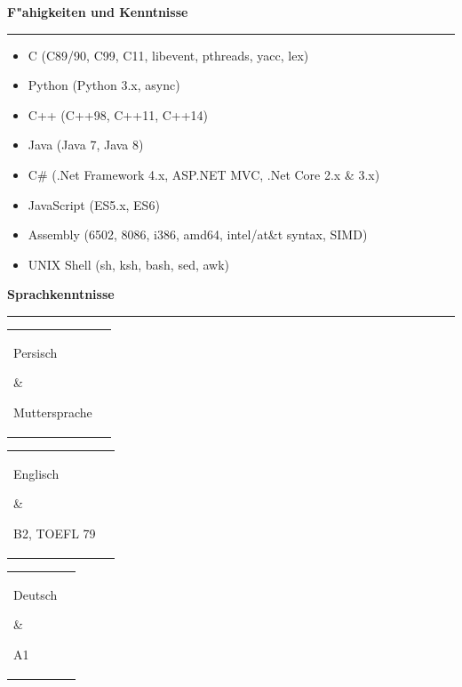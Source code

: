 \documentclass[11pt,a4paper,oneside]{article}
\makeatletter
\renewcommand{\section}[1]{%
{\large\textbf{#1}}\\
\rule[9pt]{18cm}{.4pt}\vspace{-15pt}%
}
\newenvironment{mytable}{%
\begin{tabular}{@{}l@{\hspace{4mm}}l@{}}%
}{\end{tabular}}
\newcommand{\myitem}[2]{%
\parbox[t]{16mm}{#1}&\parbox[t]{16cm}{#2}\\%
}
\makeatother
\begin{document}
\section{F"ahigkeiten und Kenntnisse}
\begin{itemize}
\item C (C89/90, C99, C11, libevent, pthreads, yacc, lex)
\item Python (Python 3.x, async)
\item C++ (C++98, C++11, C++14)
\item Java (Java 7, Java 8)
\item C\# (.Net Framework 4.x, ASP.NET MVC, .Net Core 2.x \& 3.x)
\item JavaScript (ES5.x, ES6)
\item Assembly (6502, 8086, i386, amd64, intel/at\&t syntax, SIMD)
\item UNIX Shell (sh, ksh, bash, sed, awk)
\end{itemize}

\section{Sprachkenntnisse}

\begin{mytable}\myitem{Persisch}{
	Muttersprache
}\end{mytable}

\begin{mytable}\myitem{Englisch}{
	B2, TOEFL 79
}\end{mytable}

\begin{mytable}\myitem{Deutsch}{
	A1
}\end{mytable}
\end{document}
